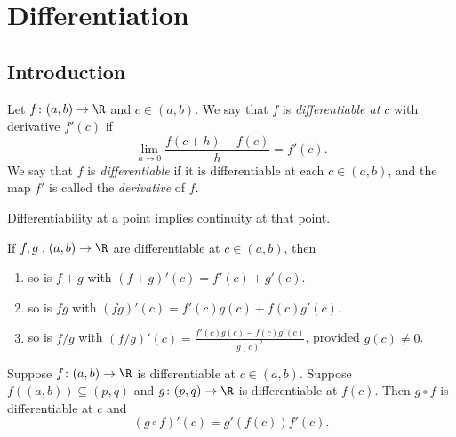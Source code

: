 \chapter{Differentiation} \label{chap:diff}
\section{Introduction} \label{sec:diff:intro}
\begin{definition}[Differentiation] \label{def:diff}
    Let $f\colon (a, b) \to \R$ and $c \in (a, b)$.
    We say that $f$ is \emph{differentiable at $c$} with derivative $f'(c)$
    if \[
        \lim_{h \to 0} \frac{f(c + h) - f(c)}{h} = f'(c).
    \]
    We say that $f$ is \emph{differentiable} if it is differentiable at
    each $c \in (a, b)$, and the map $f'$ is called the \emph{derivative}
    of $f$.
\end{definition}
\begin{exercise}
    Differentiability at a point implies continuity at that point.
\end{exercise}
\begin{exercise}
    If $f, g: (a, b) \to \R$ are differentiable at $c \in (a, b)$, then
    \begin{enumerate}
        \item so is $f + g$ with $(f + g)'(c) = f'(c) + g'(c)$.
        \item so is $fg$ with $(fg)'(c) = f'(c) g(c) + f(c) g'(c)$.
        \item so is $f/g$ with
        $(f/g)'(c) = \frac{f'(c) g(c) - f(c) g'(c)}{g(c)^2}$,
        provided $g(c) \ne 0$.
    \end{enumerate}
\end{exercise}
\newpage
\begin{exercise}
    Suppose $f\colon (a, b) \to \R$ is differentiable at $c \in (a, b)$.
    Suppose $f((a, b)) \subseteq (p, q)$ and $g\colon (p, q) \to \R$ is
    differentiable at $f(c)$.
    Then $g \circ f$ is differentiable at $c$ and \[
        (g \circ f)'(c) = g'(f(c)) f'(c).
    \]
\end{exercise}
